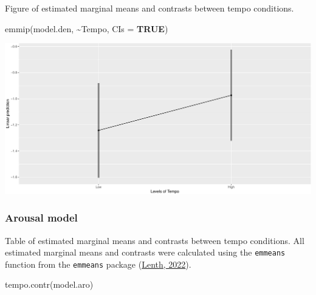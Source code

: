 \documentclass[
  bookmarksnumbered]{article}
\newenvironment{Shaded}{\begin{snugshade}}{\end{snugshade}}
\newcommand{\AttributeTok}[1]{\textcolor[rgb]{0.80,0.80,0.80}{#1}}
\newcommand{\ConstantTok}[1]{\textcolor[rgb]{0.86,0.64,0.64}{\textbf{#1}}}
\newcommand{\FunctionTok}[1]{\textcolor[rgb]{0.94,0.94,0.56}{#1}}
\newcommand{\NormalTok}[1]{\textcolor[rgb]{0.80,0.80,0.80}{#1}}
\newcommand{\SpecialCharTok}[1]{\textcolor[rgb]{0.86,0.64,0.64}{#1}}
\begin{document}
Figure of estimated marginal means and contrasts between tempo conditions.

\begin{Shaded}
\begin{Highlighting}[]
\FunctionTok{emmip}\NormalTok{(model.den, }\SpecialCharTok{\textasciitilde{}}\NormalTok{Tempo, }\AttributeTok{CIs =} \ConstantTok{TRUE}\NormalTok{)}
\end{Highlighting}
\end{Shaded}

\includegraphics{Power_analysis_files/figure-latex/unnamed-chunk-18-1.pdf}

\hypertarget{arousal-model}{%
\subsubsection{Arousal model}\label{arousal-model}}

Table of estimated marginal means and contrasts between tempo conditions. All estimated marginal means and contrasts were calculated using the \texttt{emmeans} function from the \texttt{emmeans} package (\protect\hyperlink{ref-emmeanscit}{Lenth, 2022}).

\begin{Shaded}
\begin{Highlighting}[]
\FunctionTok{tempo.contr}\NormalTok{(model.aro)}
\end{Highlighting}
\end{Shaded}
\end{document}
